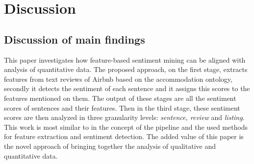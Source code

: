 %
%
\let\textcircled=\pgftextcircled
\chapter{Discussion}
\label{chap:dis}
\section{Discussion of main findings}
This paper investigates how feature-based sentiment mining can be aligned with analysis of quantitative data. The proposed approach, on the first stage, extracts features from text reviews of Airbnb based on the accommodation ontology, secondly it detects the sentiment of each sentence and it assigns this scores to the features mentioned on them. The output of these stages are all the sentiment scores of sentences and their features. Then in the third stage, these sentiment scores are then analyzed in three granularity levels: \textit{sentence, review} and \textit{listing}. This work is most similar to \cite{eirinaki2012feature, ali2015type, penalver2014feature} in the concept of the pipeline and the used methods for feature extraction and sentiment detection. The added value of this paper is the novel approach of bringing together the analysis of qualitative and quantitative data.

